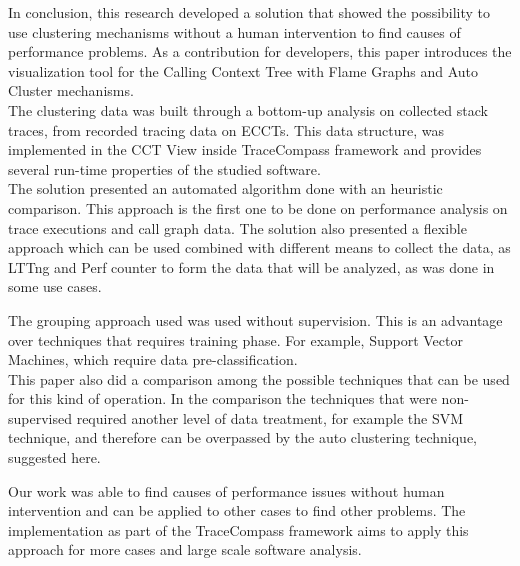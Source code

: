 
In conclusion, this research developed a solution that showed the possibility to use clustering mechanisms without a human intervention to find causes of performance problems. As a contribution for developers, this  paper  introduces  the  visualization  tool  for  the  Calling Context Tree with Flame Graphs and Auto Cluster mechanisms. \\
The clustering data was built through a bottom-up analysis on collected stack traces, from recorded tracing data on ECCTs. This data structure, was implemented in the CCT View inside TraceCompass framework and provides several run-time properties of the studied software.\\


The solution presented an automated algorithm done with an heuristic comparison. This approach is the first one to be done on performance analysis on trace executions and call graph data. The solution also presented a flexible approach which can be used combined with different means to collect the data, as LTTng and Perf counter to form the data that will be analyzed, as was done in some use cases.

The grouping approach used was used  without supervision. This is an advantage over techniques that requires training phase. For example, Support Vector Machines, which require data pre-classification. \\

This paper also did a comparison among the possible techniques that can be used for this kind of operation. In the comparison the techniques that were non-supervised required another level of data treatment, for example the SVM technique, and therefore can be overpassed by the auto clustering technique, suggested here.

Our work was able to find causes of performance issues without human intervention and can be applied to other cases to find other problems. The implementation as part of the TraceCompass framework aims to apply this approach for more cases and large scale software analysis.
